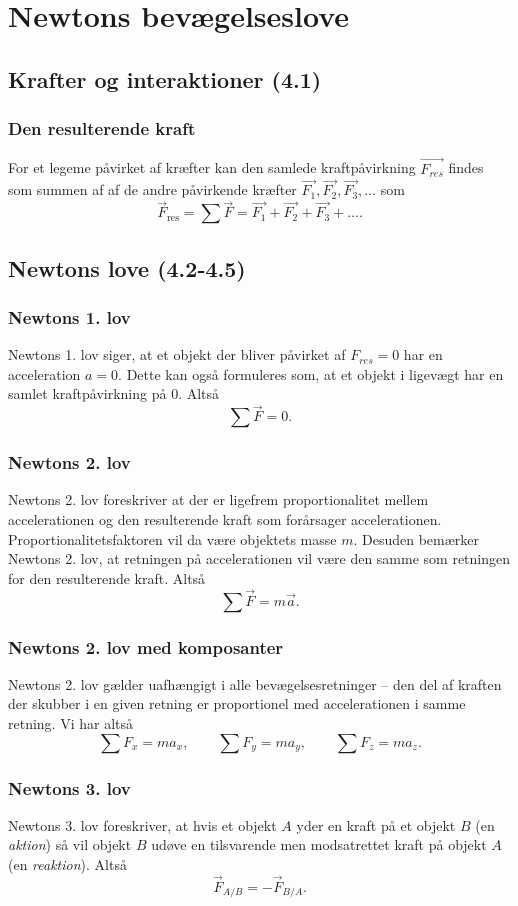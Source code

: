 \section{Newtons bevægelseslove}

\subsection{Krafter og interaktioner (4.1)}

\subsubsection{Den resulterende kraft}
For et legeme påvirket af kræfter kan den samlede kraftpåvirkning $\Vec{F_{res}}$ findes som summen af af de andre påvirkende kræfter $\Vec{F_1}, \Vec{F_2}, \Vec{F_3},\ldots $ som
\[ 
\Vec{F}_{\text{res}} = \sum \Vec{F} = \Vec{F_1} + \Vec{F_2} + \Vec{F_3} + \ldots 
.\]

\subsection{Newtons love (4.2-4.5)}

\subsubsection{Newtons 1. lov}
Newtons 1. lov siger, at et objekt der bliver påvirket af $F_{res} = 0$ har en acceleration $a = 0$. Dette kan også formuleres som, at et objekt i ligevægt har en samlet kraftpåvirkning på 0. Altså
\[ 
\sum \Vec{F} = 0
.\]

\subsubsection{Newtons 2. lov}
Newtons 2. lov foreskriver at der er ligefrem proportionalitet mellem accelerationen og den resulterende kraft som forårsager accelerationen. Proportionalitetsfaktoren vil da være objektets masse $m$. Desuden bemærker Newtons 2. lov, at retningen på accelerationen vil være den samme som retningen for den resulterende kraft. Altså
\[ 
\sum \Vec{F} = m \Vec{a}
.\]

\subsubsection{Newtons 2. lov med komposanter}
Newtons 2. lov gælder uafhængigt i alle bevægelsesretninger -- den del af kraften der skubber i en given retning er proportionel med accelerationen i samme retning. Vi har altså
\[ 
\sum F_x = ma_x, \qquad \sum F_y = ma_y, \qquad \sum F_z = ma_z
.\]

\subsubsection{Newtons 3. lov}
Newtons 3. lov foreskriver, at hvis et objekt $A$ yder en kraft på et objekt $B$ (en \textit{aktion}) så vil objekt $B$ udøve en tilsvarende men modsatrettet kraft på objekt $A$ (en \textit{reaktion}). Altså
\[ 
\Vec{F}_{A / B} = - \Vec{F}_{B / A}
.\]

